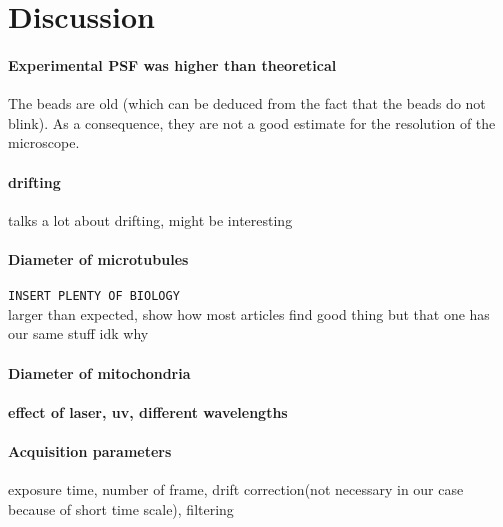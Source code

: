 \section{Discussion}
\paragraph{Experimental PSF was higher than theoretical}
The beads are old (which can be deduced from the fact that the beads do not blink).
As a consequence, they are not a good estimate for the resolution of the microscope.

\paragraph{drifting}
\cite{martens_raw_2022} talks a lot about drifting, might be interesting

\paragraph{Diameter of microtubules}
\verb|INSERT PLENTY OF BIOLOGY| \\
larger than expected, show how most articles find good thing but that one has our same stuff idk why

\paragraph{Diameter of mitochondria}

\paragraph{effect of laser, uv, different wavelengths}

\paragraph{Acquisition parameters}
exposure time, number of frame, drift correction(not necessary in our case because of short time scale), filtering